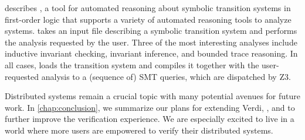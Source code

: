  describes \mypyvy,
  a tool for automated reasoning
  about symbolic transition systems in first-order logic
  that supports a variety of automated reasoning tools to analyze systems.
\mypyvy takes an input file
  describing a symbolic transition system
  and performs the analysis requested by the user.
Three of the most interesting analyses include
  inductive invariant checking,
  invariant inference, and
  bounded trace reasoning.
In all cases, \mypyvy loads the transition system
  and compiles it together with the user-requested analysis
  to a (sequence of) SMT queries,
  which are dispatched by Z3.

Distributed systems remain a crucial topic
  with many potential avenues for future work.
In \cref{chap:conclusion},
  we summarize our plans
  for extending Verdi, \disel, and \mypyvy
  to further improve the verification experience.
We are especially excited
  to live in a world where more users
  are empowered to verify their distributed systems.